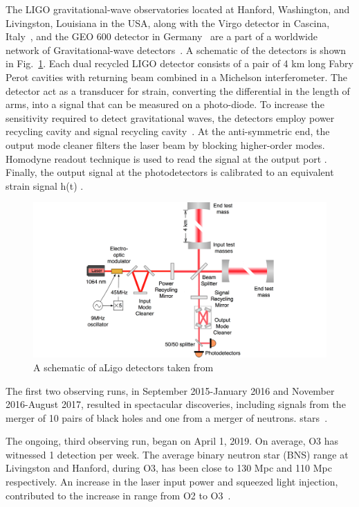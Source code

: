 \documentclass[12pt]{iopart}
\begin{document}
The LIGO  gravitational-wave observatories located at Hanford, Washington, and Livingston, Louisiana in the USA, along with the Virgo detector in Cascina, Italy~\cite{virgo}, and the GEO 600 detector in Germany~\cite{german} are a part of a worldwide network of Gravitational-wave detectors~\cite{aligo}. 
A schematic of the detectors is shown in Fig.~\ref{fig:schematic}.
Each dual recycled LIGO detector consists of a pair of 4 km long Fabry Perot cavities with returning beam combined in a Michelson interferometer. The detector act as a transducer for strain, converting the differential in the length of arms, into a signal that can be measured on a photo-diode. To increase the sensitivity required to detect gravitational waves, the detectors employ power recycling cavity and signal recycling cavity~\cite{signalr}. At the anti-symmetric end, the output mode cleaner filters the laser beam by blocking higher-order modes. Homodyne readout technique is used to read the signal at the output port \cite{Fricke_2012}. Finally, the output signal at the photodetectors is calibrated to an equivalent strain signal h(t) \cite{Abbott_2017,Viets_2018}.
\begin{figure}[h]
    \centering
    \includegraphics[width=12cm]{ligo-schematic.png}
    \caption{A schematic of aLigo detectors taken from {~\cite{schematic}} }
    \label{fig:schematic}
\end{figure}


The first two observing runs, in September 2015-January 2016 and November 2016-August 2017, resulted in spectacular discoveries, including signals from the merger of 10 pairs of black holes and one from a merger of neutrons. stars~\cite{catalogue,firstpaper,neturonpaper}.

The ongoing, third observing run, began on April 1, 2019. On average, O3 has witnessed 1 detection per week. The average binary neutron star (BNS) range at Livingston and Hanford, during O3, has been close to 130 Mpc and 110 Mpc respectively. An increase in the laser input power and squeezed light injection, contributed to the increase in range from O2 to O3~\cite{src,prospect}.
\end{document}
